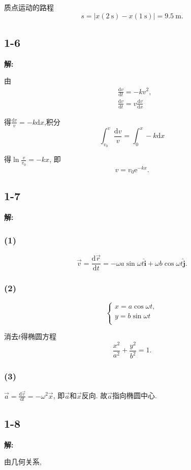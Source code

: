 \documentclass[twocolumn]{ctexart}
\begin{document}
质点运动的路程 
$$s=|x(2\ \mathrm{s})-x(1\ \mathrm{s})|=9.5\ \mathrm{m}.$$ 

\subsection*{1-6} 
\noindent 
\textbf{解:} 

由 
\begin{align*} 
&\frac{\mathrm{d}v}{\mathrm{d}t}=-kv^2,\\ 
&\frac{\mathrm{d}v}{\mathrm{d}t}=v\frac{\mathrm{d}v}{\mathrm{d}x} 
\end{align*} 

得$\displaystyle{\frac{\mathrm{d}v}{v}=-k\mathrm{d}x}$,积分 
$$\int_{v_0}^{v}\frac{\mathrm{d}v}{v}=\int_{0}^{x}-k\mathrm{d}x$$ 

得$\displaystyle{\ln\frac{v}{v_0}=-kx}$, 即 
$$v=v_0 \mathrm{e}^{-kx}.$$ 
\subsection*{1-7} 
\noindent 
\textbf{解:} 

\subsubsection*{(1)} 
$$\vec{v}=\frac{\mathrm{d}\vec{r}}{\mathrm{d}t}=-\omega a\sin\omega t\hat{\mathbf{i}}+\omega b\cos\omega t\hat{\mathbf{j}}.$$ 
\subsubsection*{(2)} 
$$ 
\left\{ 
\begin{array}{ll} 
x=a\cos\omega t,\\ 
y=b\sin\omega t\\ 
\end{array} 
\right.$$ 

消去$t$得椭圆方程 
$$\frac{x^2}{a^2}+\frac{y^2}{b^2}=1.$$ 
\subsubsection*{(3)} 
$\displaystyle{\vec{a}=\frac{\mathrm{d}\vec{v}}{\mathrm{d}t}=-{\omega}^2\vec{x}}$, 即$\vec{a}$和$\vec{x}$反向. 故$\vec{a}$指向椭圆中心. 
\subsection*{1-8} 
\noindent 
\textbf{解:} 

由几何关系, 
\end{document}
